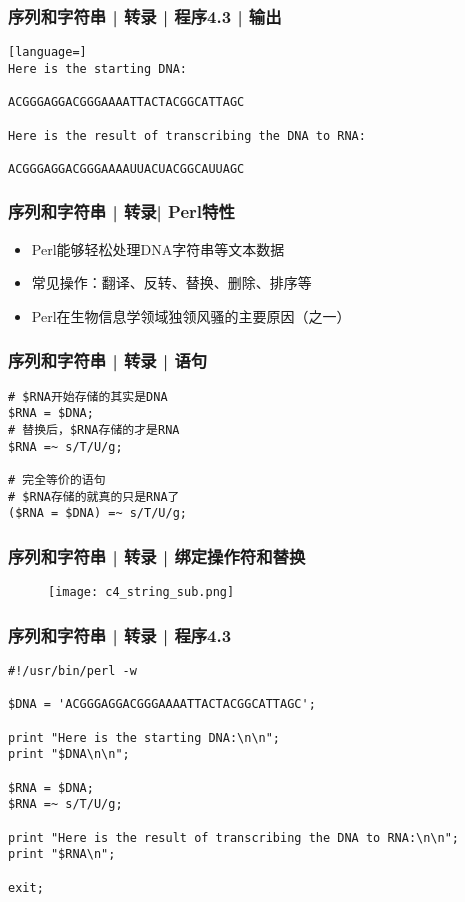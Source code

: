 \begin{frame}[fragile]
  \frametitle{序列和字符串 | 转录 | 程序4.3 | 输出}
\begin{lstlisting}[language=]
Here is the starting DNA:

ACGGGAGGACGGGAAAATTACTACGGCATTAGC

Here is the result of transcribing the DNA to RNA:

ACGGGAGGACGGGAAAAUUACUACGGCAUUAGC
\end{lstlisting}
\end{frame}

\begin{frame}
  \frametitle{序列和字符串 | 转录| Perl特性}
  \begin{itemize}
    \item Perl能够轻松处理DNA字符串等文本数据
    \item 常见操作：翻译、反转、替换、删除、排序等
    \item Perl在生物信息学领域独领风骚的主要原因（之一）
  \end{itemize}
\end{frame}

\begin{frame}[fragile]
  \frametitle{序列和字符串 | 转录 | \alert{语句}}
\begin{lstlisting}
# $RNA开始存储的其实是DNA
$RNA = $DNA;
# 替换后，$RNA存储的才是RNA
$RNA =~ s/T/U/g;

# 完全等价的语句
# $RNA存储的就真的只是RNA了
($RNA = $DNA) =~ s/T/U/g;
\end{lstlisting}
\end{frame}

\begin{frame}
  \frametitle{序列和字符串 | 转录 | \alert{绑定操作符和替换}}
  \begin{figure}
    \centering
    \texttt{[image: c4\_string\_sub.png]}
  \end{figure}
\end{frame}

\begin{frame}[fragile]
  \frametitle{序列和字符串 | 转录 | \alert{程序4.3}}
\begin{lstlisting}
#!/usr/bin/perl -w

$DNA = 'ACGGGAGGACGGGAAAATTACTACGGCATTAGC';

print "Here is the starting DNA:\n\n";
print "$DNA\n\n";

$RNA = $DNA;
$RNA =~ s/T/U/g;

print "Here is the result of transcribing the DNA to RNA:\n\n";
print "$RNA\n";

exit;
\end{lstlisting}
\end{frame}


